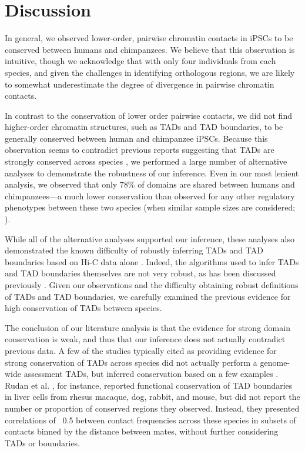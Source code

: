 \pagebreak

\section{Discussion}\label{ch02-discussion}

In general, we observed lower-order, pairwise chromatin contacts in iPSCs to be conserved between humans and chimpanzees. We believe that this observation is intuitive, though we acknowledge that with only four individuals from each species, and given the challenges in identifying orthologous regions, we are likely to somewhat underestimate the degree of divergence in pairwise chromatin contacts.

In contrast to the conservation of lower order pairwise contacts, we did not find higher-order chromatin structures, such as TADs and TAD boundaries, to be generally conserved between human and chimpanzee iPSCs. Because this observation seems to contradict previous reports suggesting that TADs are strongly conserved across species \cite{Rao.2014, Dixon.2012}, we performed a large number of alternative analyses to demonstrate the robustness of our inference. Even in our most lenient analysis, we observed that only 78\% of domains are shared between humans and chimpanzees---a much lower conservation than observed for any other regulatory phenotypes between these two species (when similar sample sizes are considered; \cite{Pai.2011, Shulha.2012, Calarco.2007, Trizzino.2017, Prescott.2015}).

While all of the alternative analyses supported our inference, these analyses also demonstrated the known difficulty of robustly inferring TADs and TAD boundaries based on Hi-C data alone \cite{Ramirez.2018, Dali.2017}. Indeed, the algorithms used to infer TADs and TAD boundaries themselves are not very robust, as has been discussed previously \cite{Dali.2017, Forcato.2017}. Given our observations and the difficulty obtaining robust definitions of TADs and TAD boundaries, we carefully examined the previous evidence for high conservation of TADs between species.

The conclusion of our literature analysis is that the evidence for strong domain conservation is weak, and thus that our inference does not actually contradict previous data. A few of the studies typically cited as providing evidence for strong conservation of TADs across species did not actually perform a genome-wide assessment TADs, but inferred conservation based on a few examples \cite{Rudan.2015, Harmston.2017, Gomez-marin.2015}. Rudan et al. \cite{Rudan.2015}, for instance, reported functional conservation of TAD boundaries in liver cells from rhesus macaque, dog, rabbit, and mouse, but did not report the number or proportion of conserved regions they observed. Instead, they presented correlations of ~0.5 between contact frequencies across these species in subsets of contacts binned by the distance between mates, without further considering TADs or boundaries.

